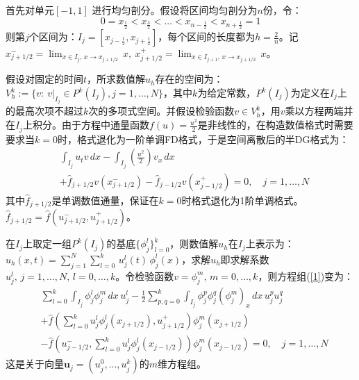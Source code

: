 \documentclass[12pt, a4paper]{ctexart}
\begin{document}
	首先对单元$[-1,1]$ 进行均匀剖分。假设将区间均匀剖分为$n$份，令：
	\begin{equation}
	0 = x_{\frac{1}{2}} < x_{\frac{3}{2}} < \dots < x_{n-\frac{1}{2}} < x_{n+\frac{1}{2}} = 1
	\end{equation}
	则第$j$个区间为：$ I_j = [x_{j- \frac{1}{2}}, x_{j + \frac{1}{2}}]$，每个区间的长度都为$h = \frac{2}{n}$。记$x_{j+1/2}^- = \lim_{x \in I_j, \, x \to x_{j+1/2}} \, x, \  x_{j+1/2}^+ = \lim_{x \in I_{j+1}, \, x \to x_{j+1/2}} \, x$。
	
	假设对固定的时间$t$，所求数值解$u_h$存在的空间为：$ V_h^k := \{ v : \  v|_{I_j} \in P^k(I_j), j = 1, \dots, N \}$，其中$k$为给定常数，$P^k(I_j)$为定义在$I_j$上的最高次项不超过$k$次的多项式空间。并假设检验函数$v \in V_h^k$，用$v$乘以方程两端并在$I_j$上积分。由于方程中通量函数$f(u) = \frac{u^2}{2}$是非线性的，在构造数值格式时需要要求当$k = 0$时，格式退化为一阶单调FD格式，于是空间离散后的半DG格式为：
	\begin{equation}
	\begin{split}
	& \int_{I_j} u_t v \, dx - \int_{I_j} (\frac{u^2}{2}) v_x \, dx\\
	& + \hat{f}_{j+1/2} v(x_{j+1/2}^-) - \hat{f}_{j-1/2} v(x_{j-1/2}^+) = 0, \quad j = 1,\dots,N
	\end{split}
	\label{1}
	\end{equation}
	其中$\hat{f}_{j+1/2}$是单调数值通量，保证在$k=0$时格式退化为1阶单调格式。$\hat{f}_{j+1/2} = \hat{f}(u_{j+1/2}^-, u_{j+1/2}^+)$。
	
	在$I_j$上取定一组$P^k(I_j)$的基底$\{ \phi_j^l \}_{l=0}^k$，则数值解$u_h$在$I_j$上表示为：$u_h(x,t) = \sum_{j=1}^N \sum_{l=0}^k \, u_j^l(t) \, \phi_j^l(x)$，求解$u_h$即求解系数$u_j^l, \, j=1, \dots, N, \, l=0, \dots, k$。令检验函数$v = \phi_j^m, \, m=0, \dots, k$，则方程组(\ref{1})变为：
	\begin{equation}
	\begin{split}
	& \sum_{l=0}^k \int_{I_j} \phi_j^l \phi_j^m \, dx \, u_j^l - \frac{1}{2}\sum_{p,q=0}^k \int_{I_j} \phi_j^p \phi_j^q (\phi_j^m)_x \, dx \, u_j^p u_j^q \\
	& + \hat{f}(\sum_{l=0}^k u_j^l \phi_j^l(x_{j+1/2}),u_{j+1/2}^+) \phi_j^m(x_{j+1/2})\\
	& - \hat{f}(u_{j-1/2}^-, \sum_{l=0}^k u_j^l \phi_j^l(x_{j-1/2} )) \phi_j^m(x_{j-1/2}) = 0, \quad j = 1, \dots,N
	\end{split}
	\label{2}
	\end{equation}
	这是关于向量$\textbf{u}_j = (u_j^0,\dots, u_j^k)$的$m$维方程组。
	
\end{document}
